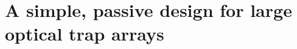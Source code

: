 \chapter{A simple, passive design for large optical trap arrays}\label{ch:array_pra}



%
%
%
%
%
%
%


 


